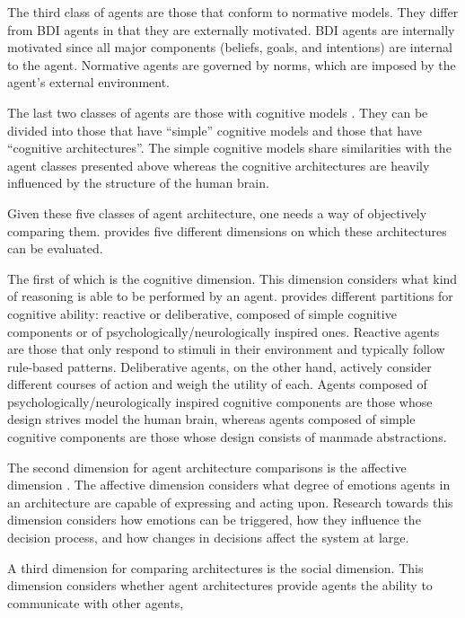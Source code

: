The third class of agents are those that conform to normative models.
They differ from BDI agents in that they are externally motivated.
BDI agents are internally motivated since all major components (beliefs, goals, and intentions) are internal to the agent.
Normative agents are governed by norms, which are imposed by the agent's external environment.

The last two classes of agents are those with cognitive models \cite{balke_how_2014}.
They can be divided into those that have ``simple'' cognitive models and those that have ``cognitive architectures''.
The simple cognitive models share similarities with the agent classes presented above
whereas the cognitive architectures are heavily influenced by the structure of the human brain.

Given these five classes of agent architecture, one needs a way of objectively comparing them.
\cite{balke_how_2014} provides five different dimensions on which these architectures can be evaluated.

The first of which is the cognitive dimension.
This dimension considers what kind of reasoning is able to be performed by an agent.
\cite{balke_how_2014} provides different partitions for cognitive ability:
reactive or deliberative, composed of simple cognitive components or of psychologically/neurologically inspired ones.
Reactive agents are those that only respond to stimuli in their environment and typically follow rule-based patterns.
Deliberative agents, on the other hand, actively consider different courses of action and weigh the utility of each.
Agents composed of psychologically/neurologically inspired cognitive components are those whose design strives model the human brain,
whereas agents composed of simple cognitive components are those whose design consists of manmade abstractions.

The second dimension for agent architecture comparisons is the affective dimension \cite{balke_how_2014}.
The affective dimension considers what degree of emotions agents in an architecture are capable of expressing and acting upon.
Research towards this dimension considers how emotions can be triggered,
how they influence the decision process, and how changes in decisions affect the system at large.

A third dimension for comparing architectures is the social dimension.
This dimension considers whether agent architectures provide agents the ability to communicate with other agents,
